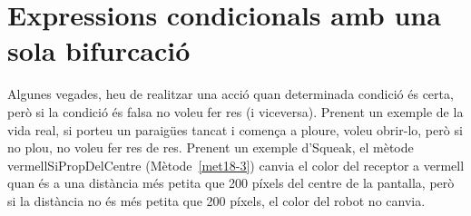\section{Expressions condicionals amb una sola bifurcació}
Algunes vegades, heu de realitzar una acció quan determinada condició és certa, però si la condició és falsa no voleu fer res (i viceversa). Prenent un exemple de la vida real, si porteu un paraigües tancat i comença a ploure, voleu obrir-lo, però si no plou, no voleu fer res de res. Prenent un exemple d'Squeak, el mètode \textsf{vermellSiPropDelCentre} (Mètode~\ref{met18-3}) canvia el color del receptor a vermell quan és a una distància més petita que 200 píxels del centre de la pantalla, però si la distància no és més petita que 200 píxels, el color del robot no canvia.

